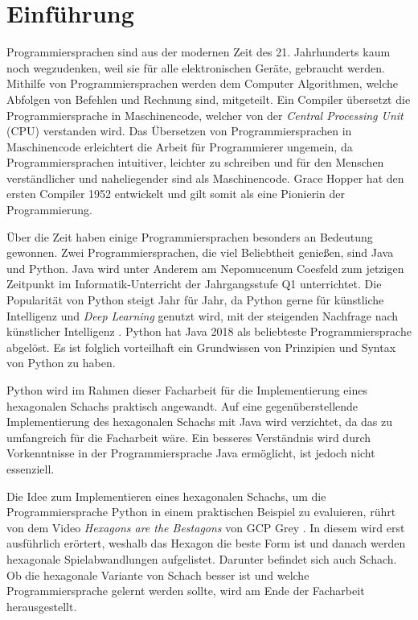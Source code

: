 \chapter{Einführung}
Programmiersprachen sind aus der modernen Zeit des 21. Jahrhunderts kaum noch wegzudenken, weil sie für alle elektronischen Geräte, gebraucht werden. 
Mithilfe von Programmiersprachen werden dem Computer Algorithmen, welche Abfolgen von Befehlen und Rechnung sind, mitgeteilt. 
Ein Compiler übersetzt die Programmiersprache in Maschinencode, welcher von der \textit{Central Processing Unit} (CPU) verstanden wird. 
Das Übersetzen von Programmiersprachen in Maschinencode erleichtert die Arbeit für Programmierer ungemein, da Programmiersprachen intuitiver, leichter zu schreiben und für den Menschen verständlicher und naheliegender sind als Maschinencode. 
Grace Hopper hat den ersten Compiler 1952 entwickelt und gilt somit als eine Pionierin der Programmierung.
\cite{Louis:2010}

\par Über die Zeit haben einige Programmiersprachen besonders an Bedeutung gewonnen. 
Zwei Programmiersprachen, die viel Beliebtheit genießen, sind Java und Python. 
Java wird unter Anderem am Nepomucenum Coesfeld zum jetzigen Zeitpunkt im Informatik-Unterricht der Jahrgangsstufe Q1 unterrichtet. 
Die Popularität von Python steigt Jahr für Jahr, da Python gerne für künstliche Intelligenz und \textit{Deep Learning} genutzt wird, mit der steigenden Nachfrage nach künstlicher Intelligenz \cite{Github:PYPL}\cite{Gray:2017}. 
Python hat Java 2018 als beliebteste Programmiersprache abgelöst. 
Es ist folglich vorteilhaft ein Grundwissen von Prinzipien und Syntax von Python zu haben. 

\par Python wird im Rahmen dieser Facharbeit für die Implementierung eines hexagonalen Schachs praktisch angewandt. 
Auf eine gegenüberstellende Implementierung des hexagonalen Schachs mit Java wird verzichtet, da das zu umfangreich für die Facharbeit wäre. 
Ein besseres Verständnis wird durch Vorkenntnisse in der Programmiersprache Java ermöglicht, ist jedoch nicht essenziell. 

\par Die Idee zum Implementieren eines hexagonalen Schachs, um die Programmiersprache Python in einem praktischen Beispiel zu evaluieren, rührt von dem Video \textit{Hexagons are the Bestagons} von GCP Grey \cite{Grey:Bestagons}. 
In diesem wird erst ausführlich erörtert, weshalb das Hexagon die beste Form ist und danach werden hexagonale Spielabwandlungen aufgelistet. 
Darunter befindet sich auch Schach. 
Ob die hexagonale Variante von Schach besser ist und welche Programmiersprache gelernt werden sollte, wird am Ende der Facharbeit herausgestellt.
